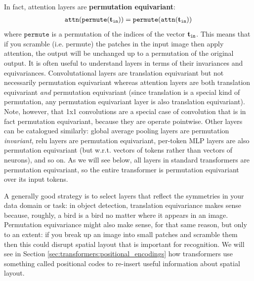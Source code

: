 In fact, attention layers are \textbf{permutation equivariant}:
\begin{align}
    \texttt{attn}(\texttt{permute}(\mathbf{t}_{\texttt{in}})) = \texttt{permute}(\texttt{attn}(\mathbf{t}_{\texttt{in}}))
\end{align}
where $\texttt{permute}$ is a permutation of the indices of the vector $\mathbf{t}_{\texttt{in}}$. This means that if you scramble (i.e. permute) the patches in the input image then apply attention, the output will be unchanged up to a permutation of the original output. It is often useful to understand layers in terms of their invariances and equivariances. Convolutational layers are translation equivariant but not necessarily permutation equivariant whereas attention layers are both translation equivariant \textit{and} permutation equivariant (since translation is a special kind of permutation, any permutation equivariant layer is also translation equivariant). Note, however, that 1x1 convolutions are a special case of convolution that is in fact permutation equivariant, because they are operate pointwise. Other layers can be catalogued similarly: global average pooling layers are permutation \textit{invariant}, relu layers are permutation equivariant, per-token MLP layers are also permutation equivariant (but w.r.t. vectors of tokens rather than vectors of neurons), and so on. As we will see below, all layers in standard transformers are permutation equivariant, so the entire transformer is permutation equivariant over its input tokens.

A generally good strategy is to select layers that reflect the symmetries in your data domain or task: in object detection, translation equivariance makes sense because, roughly, a bird is a bird no matter where it appears in an image. Permutation equivariance might also make sense, for that same reason, but only to an extent: if you break up an image into small patches and scramble them then this could disrupt spatial layout that is important for recognition. We will see in Section \ref{sec:transformers:positional_encodings} how transformers use something called positional codes to re-insert useful information about spatial layout.




